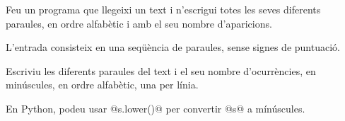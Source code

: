 

\Statement

Feu un programa que llegeixi un text i n'escrigui totes les seves diferents paraules, en ordre alfabètic i amb el seu nombre d'aparicions.

\Input

L'entrada consisteix en una seqüència de paraules, sense signes de puntuació.

\Output

Escriviu les diferents paraules del text i el seu nombre d'ocurrències, en minúscules, en ordre alfabètic, una per línia.

\Observation

En Python, podeu usar @s.lower()@ per convertir @s@ a mínúscules.

\Sample
